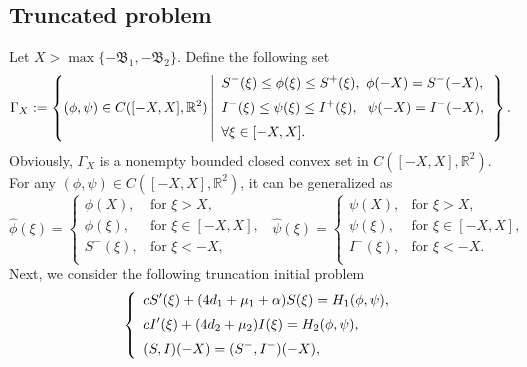 \documentclass[final,3p,times]{elsarticle}
\numberwithin{equation}{section}
\begin{document}
\subsection{Truncated problem}
Let $X>\max\{-\mathfrak{B}_1,-\mathfrak{B}_2\}$. Define the following set
\begin{equation*}
\Gamma_X := \left\{(\phi, \psi)\in C([-X,X],\mathbb{R}^2)\left|
\begin{array}{l}
\vspace{2mm}
\displaystyle   S^-(\xi)\leq \phi(\xi) \leq S^+(\xi),\  \phi(-X)=S^-(-X),\\
\vspace{2mm}
\displaystyle   I^-(\xi)\leq \psi(\xi) \leq I^+(\xi),\ \ \psi(-X)=I^-(-X),\\
\displaystyle   \forall\xi\in[-X,X].\\
\end{array}\right.\right\}.
\end{equation*}
Obviously, $\Gamma_X$ is a nonempty bounded closed convex set in $C([-X,X],\mathbb{R}^2)$. For any $(\phi,\psi)\in C([-X,X],\mathbb{R}^2)$, it can be generalized as
\begin{equation*}
\hat{\phi}(\xi)=\left\{
\begin{array}{ll}
\displaystyle   \phi(X), &\mbox{for $\xi>X$,}
\\
\displaystyle   \phi(\xi), &\mbox{for $\xi\in[-X, X]$,}
\\
\displaystyle   S^-(\xi), &\mbox{for $\xi< -X$,}\\
\end{array}\right.\ \ \
\hat{\psi}(\xi)=\left\{
\begin{array}{ll}
\displaystyle   \psi(X), &\mbox{for $\xi>X$,}
\\
\displaystyle   \psi(\xi), &\mbox{for $\xi\in[-X, X]$,}
\\
\displaystyle   I^-(\xi), &\mbox{for $\xi< -X$.}\\
\end{array}\right.
\end{equation*}
Next, we consider the following truncation initial problem
\begin{equation}
\label{TruPro}\left\{
\begin{array}{l}
\vspace{2mm}
\displaystyle   cS'(\xi) + (4d_1+\mu_1+\alpha)S(\xi) = H_1(\phi,\psi),\\
\vspace{2mm}
\displaystyle   cI'(\xi) + (4d_2+\mu_2)I(\xi) = H_2(\phi,\psi),\\
\displaystyle   (S,I)(-X) = (S^-,I^-)(-X),
\end{array}\right.
\end{equation}
\end{document}
